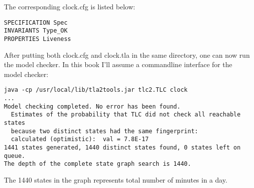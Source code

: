 The corresponding clock.cfg is listed below: 
\begin{framed}
\begin{verbatim}
SPECIFICATION Spec
INVARIANTS Type_OK
PROPERTIES Liveness
\end{verbatim}
\end{framed}

After putting both clock.cfg and clock.tla in the same directory, one can now
run the model checker. In this book I'll assume a commandline interface for the
model checker:
\begin{verbatim}
java -cp /usr/local/lib/tla2tools.jar tlc2.TLC clock
...
Model checking completed. No error has been found.
  Estimates of the probability that TLC did not check all reachable states
  because two distinct states had the same fingerprint:
  calculated (optimistic):  val = 7.8E-17
1441 states generated, 1440 distinct states found, 0 states left on queue.
The depth of the complete state graph search is 1440.
\end{verbatim}
The 1440 states in the graph represents total number of minutes in a day.
